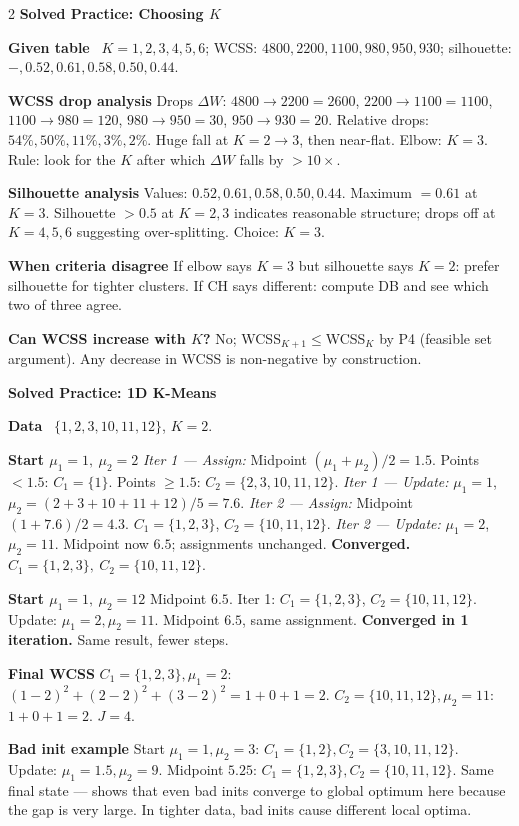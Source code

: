 \documentclass[10pt,fleqn]{article}
\newcommand{\shead}[1]{\vspace{0.1ex}\textbf{\scriptsize #1}\par}
\newcommand{\topic}[1]{\textbf{#1}\ }
\newcommand{\qa}[2]{\textbf{#1} #2\par}
\begin{document}
\begin{multicols*}{2}
\shead{Solved Practice: Choosing \(K\)}
\topic{Given table} \(K=1,2,3,4,5,6\); WCSS: \(4800,2200,1100,980,950,930\); silhouette: \(-,0.52,0.61,0.58,0.50,0.44\).

\qa{WCSS drop analysis}{Drops \(\Delta W\): \(4800\to2200=2600\), \(2200\to1100=1100\), \(1100\to980=120\), \(980\to950=30\), \(950\to930=20\). Relative drops: \(54\%,50\%,11\%,3\%,2\%\). Huge fall at \(K=2\to3\), then near-flat. Elbow: \(\boxed{K=3}\). Rule: look for the \(K\) after which \(\Delta W\) falls by \(>\!10\times\).}
\qa{Silhouette analysis}{Values: \(0.52,0.61,0.58,0.50,0.44\). Maximum \(=0.61\) at \(K=3\). Silhouette \(>0.5\) at \(K=2,3\) indicates reasonable structure; drops off at \(K=4,5,6\) suggesting over-splitting. Choice: \(\boxed{K=3}\).}
\qa{When criteria disagree}{If elbow says \(K=3\) but silhouette says \(K=2\): prefer silhouette for tighter clusters. If CH says different: compute DB and see which two of three agree.}
\qa{Can WCSS increase with \(K\)?}{No; WCSS\(_{K+1}\le\)WCSS\(_K\) by P4 (feasible set argument). Any decrease in WCSS is non-negative by construction.}

\shead{Solved Practice: 1D K-Means}
\topic{Data} \(\{1,2,3,10,11,12\}\), \(K=2\).

\qa{Start \(\mu_1=1,\ \mu_2=2\)}{
\textit{Iter 1 — Assign:} Midpoint \((\mu_1+\mu_2)/2=1.5\). Points \(<1.5\): \(C_1=\{1\}\). Points \(\ge1.5\): \(C_2=\{2,3,10,11,12\}\).
\textit{Iter 1 — Update:} \(\mu_1=1\), \(\mu_2=(2+3+10+11+12)/5=7.6\).
\textit{Iter 2 — Assign:} Midpoint \((1+7.6)/2=4.3\). \(C_1=\{1,2,3\}\), \(C_2=\{10,11,12\}\).
\textit{Iter 2 — Update:} \(\mu_1=2\), \(\mu_2=11\). Midpoint now \(6.5\); assignments unchanged. \textbf{Converged.} \(\boxed{C_1=\{1,2,3\},\ C_2=\{10,11,12\}}\).}
\qa{Start \(\mu_1=1,\ \mu_2=12\)}{Midpoint \(6.5\). Iter 1: \(C_1=\{1,2,3\}\), \(C_2=\{10,11,12\}\). Update: \(\mu_1=2,\mu_2=11\). Midpoint \(6.5\), same assignment. \textbf{Converged in 1 iteration.} Same result, fewer steps.}
\qa{Final WCSS}{\(C_1=\{1,2,3\},\mu_1=2\): \((1{-}2)^2+(2{-}2)^2+(3{-}2)^2=1+0+1=2\). \(C_2=\{10,11,12\},\mu_2=11\): \(1+0+1=2\). \(\boxed{J=4}\).}
\qa{Bad init example}{Start \(\mu_1=1,\mu_2=3\): \(C_1=\{1,2\},C_2=\{3,10,11,12\}\). Update: \(\mu_1=1.5,\mu_2=9\). Midpoint \(5.25\): \(C_1=\{1,2,3\},C_2=\{10,11,12\}\). Same final state — shows that even bad inits converge to global optimum here because the gap is very large. In tighter data, bad inits cause different local optima.}


\end{multicols*}
\end{document}
